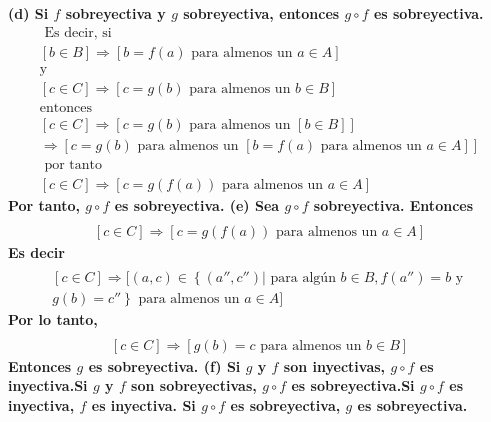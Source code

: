 \documentclass{article}
\begin{document}
\newline
\bf (d) \rm Si \(f\) sobreyectiva y \(g\) sobreyectiva, entonces \( g\circ f \) es sobreyectiva. 
\begin{equation}
\begin{aligned}
\text{ Es decir, si}
\\
[b \in B] \Rightarrow [b=f\left( a\right) \text{ para almenos un } a \in A]
\\ \text{y}
\\
[c \in C] \Rightarrow [c=g\left( b\right) \text{ para almenos un } b \in B]
\\ \text{entonces}
\\
[c \in C] \Rightarrow [c=g\left( b\right) \text{ para almenos un } [b \in B]]
\\ \Rightarrow [c=g\left( b\right)
\text{ para almenos un } [b=f\left( a\right) \text{ para almenos un } a \in A]]
\\ \text{ por tanto } \\
[c \in C] \Rightarrow [c=g\left( f\left( a\right)\right) \text{ para almenos un } a \in A]
\end{aligned}
\end{equation}
Por tanto, \(g \circ f \) es sobreyectiva.
\newline
\bf (e) \rm Sea \(g \circ f\) sobreyectiva. Entonces
\begin{equation}
\begin{aligned}\\
[c \in C] \Rightarrow [c=g\left( f\left( a\right)\right) \text{ para almenos un } a \in A]
\end{aligned}
\end{equation}
Es decir
\begin{equation}
\begin{aligned}
\\
[c \in C] \Rightarrow [(a,c) \in \left\{ \left(a'',c'' \right)|\text{ para algún } b \in B, f\left( a''\right)= b \text{ y } \right. \\ \left.  g \left( b \right)=c'' \right\} \text{ para almenos un } a \in A]
\end{aligned}
\end{equation}
Por lo tanto,
\begin{equation}
\begin{aligned}
\\
[c \in C] \Rightarrow [g\left( b\right)= c\text{ para almenos un } b \in B]
\end{aligned}
\end{equation}
Entonces \(g\) es sobreyectiva.
\newline
\bf (f) \rm Si \(g\) y \(f\) son inyectivas, \( g \circ f\) es inyectiva.\newline Si \(g\) y \(f\) son sobreyectivas, \( g \circ f\) es sobreyectiva.\newline Si  \( g \circ f\) es inyectiva, \( f\) es inyectiva. \newline Si \( g \circ f\) es sobreyectiva,  \( g \) es sobreyectiva.
\end{document}
